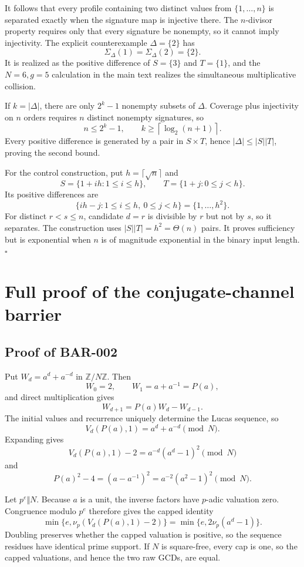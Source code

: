\documentclass[11pt]{article}
\begin{document}
It follows that every profile containing two distinct values from
\(\{1,\ldots,n\}\) is separated exactly when the signature map is injective
there. The \(n\)-divisor property requires only that every signature be
nonempty, so it cannot imply injectivity. The explicit counterexample
\(\Delta=\{2\}\) has
\[
\Sigma_\Delta(1)=\Sigma_\Delta(2)=\{2\}.
\]
It is realized as the positive difference of \(S=\{3\}\) and \(T=\{1\}\),
and the \(N=6,g=5\) calculation in the main text realizes the simultaneous
multiplicative collision.

If \(k=|\Delta|\), there are only \(2^k-1\) nonempty subsets of \(\Delta\).
Coverage plus injectivity on \(n\) orders requires \(n\) distinct nonempty
signatures, so
\[
n\le2^k-1,\qquad
k\ge\left\lceil\log_2(n+1)\right\rceil.
\]
Every positive difference is generated by a pair in \(S\times T\), hence
\(|\Delta|\le|S||T|\), proving the second bound.

For the control construction, put \(h=\lceil\sqrt n\rceil\) and
\[
S=\{1+ih:1\le i\le h\},\qquad
T=\{1+j:0\le j<h\}.
\]
Its positive differences are
\[
\{ih-j:1\le i\le h,\ 0\le j<h\}
=\{1,\ldots,h^2\}.
\]
For distinct \(r<s\le n\), candidate \(d=r\) is divisible by \(r\) but not by
\(s\), so it separates. The construction uses
\(|S||T|=h^2=\Theta(n)\) pairs. It proves sufficiency but is exponential when
\(n\) is of magnitude exponential in the binary input length. \(\square\)

\section{Full proof of the conjugate-channel barrier}

\subsection{Proof of BAR-002}\label{proof:BAR-002}

Put \(W_d=a^d+a^{-d}\) in \(\mathbb Z/N\mathbb Z\). Then
\[
W_0=2,\qquad W_1=a+a^{-1}=P(a),
\]
and direct multiplication gives
\[
W_{d+1}=P(a)W_d-W_{d-1}.
\]
The initial values and recurrence uniquely determine the Lucas sequence, so
\[
V_d(P(a),1)=a^d+a^{-d}\pmod N.
\]
Expanding gives
\[
V_d(P(a),1)-2
=a^{-d}(a^d-1)^2\pmod N
\]
and
\[
P(a)^2-4=(a-a^{-1})^2
=a^{-2}(a^2-1)^2\pmod N.
\]

Let \(p^e\Vert N\). Because \(a\) is a unit, the inverse factors have
\(p\)-adic valuation zero. Congruence modulo \(p^e\) therefore gives the
capped identity
\[
\min\{e,\nu_p(V_d(P(a),1)-2)\}
=\min\{e,2\nu_p(a^d-1)\}.
\]
Doubling preserves whether the capped valuation is positive, so the sequence
residues have identical prime support. If \(N\) is square-free, every cap is
one, so the capped valuations, and hence the two raw GCDs, are equal.
\end{document}
